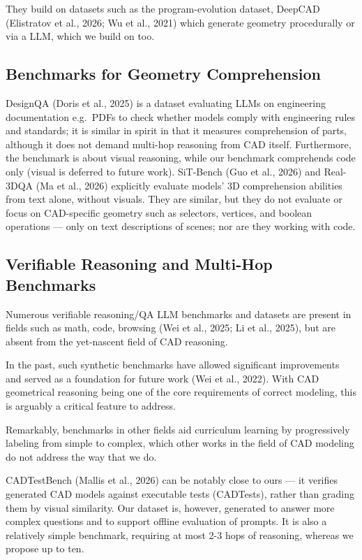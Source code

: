 \documentclass[10pt]{article}
\begin{document}
They build on datasets such as the program-evolution dataset, DeepCAD (Elistratov et al., 2026; Wu et al., 2021) which generate geometry procedurally or via a LLM, which we build on too.

\subsection{Benchmarks for Geometry Comprehension}

DesignQA (Doris et al., 2025) is a dataset evaluating LLMs on engineering documentation e.g.\ PDFs to check whether models comply with engineering rules and standards; it is similar in spirit in that it measures comprehension of parts, although it does not demand multi-hop reasoning from CAD itself. Furthermore, the benchmark is about visual reasoning, while our benchmark comprehends code only (visual is deferred to future work).
SiT-Bench (Guo et al., 2026) and Real-3DQA (Ma et al., 2026) explicitly evaluate models' 3D comprehension abilities from text alone, without visuals. They are similar, but they do not evaluate or focus on CAD-specific geometry such as selectors, vertices, and boolean operations --- only on text descriptions of scenes; nor are they working with code.

\subsection{Verifiable Reasoning and Multi-Hop Benchmarks}

Numerous verifiable reasoning/QA LLM benchmarks and datasets are present in fields such as math, code, browsing (Wei et al., 2025; Li et al., 2025), but are absent from the yet-nascent field of CAD reasoning.

In the past, such synthetic benchmarks have allowed significant improvements and served as a foundation for future work (Wei et al., 2022). With CAD geometrical reasoning being one of the core requirements of correct modeling, this is arguably a critical feature to address.

Remarkably, benchmarks in other fields aid curriculum learning by progressively labeling from simple to complex, which other works in the field of CAD modeling do not address the way that we do.

CADTestBench (Mallis et al., 2026) can be notably close to ours --- it verifies generated CAD models against executable tests (CADTests), rather than grading them by visual similarity. Our dataset is, however, generated to answer more complex questions and to support offline evaluation of prompts. It is also a relatively simple benchmark, requiring at most 2-3 hops of reasoning, whereas we propose up to ten.
\end{document}
